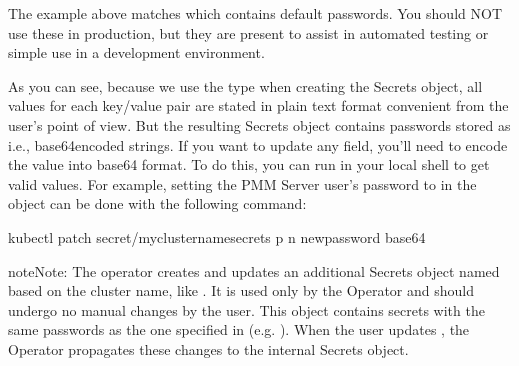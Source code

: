 \documentclass[letterpaper,10pt,english]{sphinxmanual}
\begin{document}
The example above matches
{\hyperref[\detokenize{users:users-development-mode}]{}} which
contains default passwords. You should NOT use these in production, but they are
present to assist in automated testing or simple use in a development
environment.

As you can see, because we use the  type when creating the Secrets
object, all values for each key/value pair are stated in plain text format
convenient from the user’s point of view. But the resulting Secrets
object contains passwords stored as  \sphinxhyphen{} i.e., base64\sphinxhyphen{}encoded strings.
If you want to update any field, you’ll need to encode the value into base64
format. To do this, you can run  in your local
shell to get valid values. For example, setting the PMM Server user’s password
to  in the  object can be done
with the following command:

\begin{sphinxVerbatim}[commandchars=\\\{\}]
kubectl patch secret/my\PYGZhy{}cluster\PYGZhy{}name\PYGZhy{}secrets \PYGZhy{}p  \PYGZhy{}n new\PYGZus{}password  base64
\end{sphinxVerbatim}

\begin{sphinxadmonition}{note}{Note:}
The operator creates and updates an additional Secrets object named
based on the cluster name, like . It is
used only by the Operator and should undergo no manual changes by the user.
This object contains secrets with the same passwords as the one specified
in  (e.g. ). When the user
updates , the Operator propagates these changes to
the internal  Secrets object.
\end{sphinxadmonition}
\end{document}
